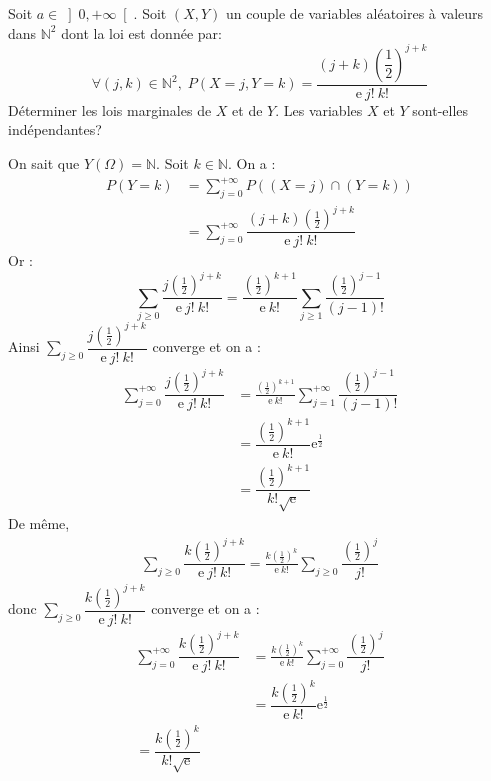 \documentclass[a4paper,10pt]{report}
\begin{document}
\begin{Exercice}{} Soit $a\in {\left] 0,+\infty\right[ }$. Soit $(X,Y)$ un couple de variables aléatoires à valeurs dans $\mathbb{N}^2$ dont la loi est donnée par: 
$$\forall (j,k)\in {\mathbb{N}^2}, \; P(X=j,Y=k)=\dfrac{(j+k)\left( \dfrac{1}{2}\right) ^{j+k}}{\mathrm{e}\:j!\:k!}$$
Déterminer les lois marginales de $X$ et de $Y$. Les variables $X$ et $Y$ sont-elles indépendantes?
\end{Exercice}

\corr On sait que $Y(\Omega)=\mathbb{N}$. Soit $k\in\mathbb{N}$. On a :
\begin{align*}
 P(Y=k)& =\displaystyle\sum\limits_{j=0}^{+\infty} P((X=j) \cap (Y=k)) \\
 & =\displaystyle\sum\limits_{j=0}^{+\infty}\dfrac{(j+k)\left( \tfrac{1}{2}\right) ^{j+k}}{\text{e}\:j!\:k!}
 \end{align*}
Or :
 $$\displaystyle\sum\limits_{j\geq 0}^{}\dfrac{j\left(\tfrac{1}{2} \right) ^{j+k}}{\text{e}\:j!\:k!}=\dfrac{\left(\tfrac{1}{2} \right)^{k+1}}{\text{e}\:k!}\displaystyle\sum\limits_{j\geq 1}^{}\dfrac{\left(\tfrac{1}{2} \right)^{j-1}}{(j-1)!}$$
Ainsi $\displaystyle\sum\limits_{j\geq 0}^{}\dfrac{j\left(\tfrac{1}{2} \right)^{j+k}}{\text{e}\:j!\:k!}$ converge et on a :
\begin{align*}
\sum\limits_{j=0}^{+\infty}\dfrac{j\left(\tfrac{1}{2} \right)^{j+k}}{\text{e}\:j!\:k!}& =\frac{\left(\tfrac{1}{2} \right)^{k+1}}{\text{e}\:k!}\displaystyle\sum\limits_{j=1}^{+\infty}\dfrac{\left(\tfrac{1}{2} \right)^{j-1}}{(j-1)!} \\
& =\dfrac{\left(\tfrac{1}{2} \right)^{k+1}}{\text{e}\:k!}\text{e}^{\tfrac{1}{2}} \\
& =\dfrac{\left(\tfrac{1}{2} \right)^{k+1}}{k!\sqrt{\mathrm{e}}}
\end{align*}
De même,  
\begin{align*}
\displaystyle\sum\limits_{j\geq 0}^{}\dfrac{k\left(\tfrac{1}{2} \right)^{j+k}}{\text{e}\:j!\:k!}=\frac{k\left(\tfrac{1}{2} \right)^{k}}{\text{e}\:k!}\displaystyle\sum\limits_{j\geq 0}^{}\dfrac{\left(\tfrac{1}{2} \right)^{j}}{j!}
\end{align*}
donc $\displaystyle\sum\limits_{j\geq 0}^{}\dfrac{k\left(\tfrac{1}{2} \right)^{j+k}}{\text{e}\:j!\:k!}$ converge et on a :
\begin{align*}
\displaystyle\sum\limits_{j=0}^{+\infty}\dfrac{k\left(\tfrac{1}{2} \right)^{j+k}}{\text{e}\:j!\:k!}& =\frac{k\left(\tfrac{1}{2} \right)^{k}}{\text{e}\:k!}\displaystyle\sum\limits_{j=0}^{+\infty}\dfrac{\left(\tfrac{1}{2} \right)^{j}}{j!} \\
& =\dfrac{k\left(\tfrac{1}{2} \right)^{k}}{\text{e}\:k!}\text{e}^{\tfrac{1}{2}}\\
=\dfrac{k\left(\tfrac{1}{2} \right)^{k}}{k!\sqrt{\mathrm{e}}}
\end{align*}
\end{document}
